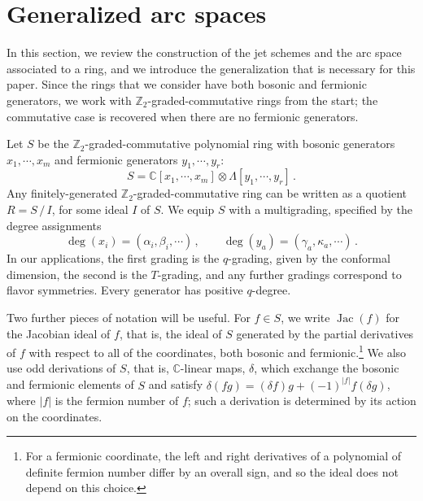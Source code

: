\documentclass[12pt]{article}
\numberwithin{equation}{section}
\numberwithin{figure}{section}
\theoremstyle{plain}
\theoremstyle{definition}
\begin{document}
\section{Generalized arc spaces}\label{sec:arcs}

In this section, we review the construction of the jet schemes and the arc space associated to a ring, and we introduce the generalization that is necessary for this paper. Since the rings that we consider have both bosonic and fermionic generators, we work with $\mathbb{Z}_2$-graded-commutative rings from the start; the commutative case is recovered when there are no fermionic generators.

Let $S$ be the $\mathbb{Z}_2$-graded-commutative polynomial ring with bosonic generators $x_1, \cdots, x_m$ and fermionic generators $y_1, \cdots, y_r$:
\begin{equation}
    S = \mathbb{C}[x_1, \cdots, x_m] \otimes \Lambda[y_1, \cdots, y_r] \,.
\end{equation}
Any finitely-generated $\mathbb{Z}_2$-graded-commutative ring can be written as a quotient $R = S \, / \, I$, for some ideal $I$ of $S$. We equip $S$ with a multigrading, specified by the degree assignments
\begin{equation}
    \operatorname{deg}(x_i) = (\alpha_i, \beta_i, \cdots) \,, \qquad \operatorname{deg}(y_a) = (\gamma_a, \kappa_a, \cdots) \,.
\end{equation}
In our applications, the first grading is the $q$-grading, given by the conformal dimension, the second is the $T$-grading, and any further gradings correspond to flavor symmetries. Every generator has positive $q$-degree.

Two further pieces of notation will be useful. For $f \in S$, we write $\operatorname{Jac}(f)$ for the Jacobian ideal of $f$, that is, the ideal of $S$ generated by the partial derivatives of $f$ with respect to all of the coordinates, both bosonic and fermionic.\footnote{For a fermionic coordinate, the left and right derivatives of a polynomial of definite fermion number differ by an overall sign, and so the ideal does not depend on this choice.} We also use odd derivations of $S$, that is, $\mathbb{C}$-linear maps, $\delta$, which exchange the bosonic and fermionic elements of $S$ and satisfy $\delta(fg) = (\delta f) g + (-1)^{|f|} f (\delta g)$, where $|f|$ is the fermion number of $f$; such a derivation is determined by its action on the coordinates.
\end{document}
